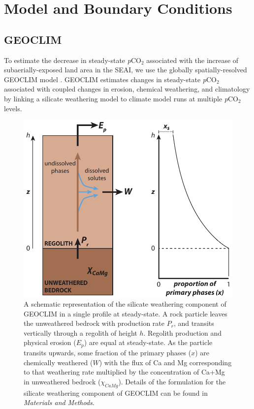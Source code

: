 \documentclass[9pt,twocolumn,twoside,lineno]{pnas-new}
\newcommand{\pCOtwo}{\textit{p}CO$_{2}$\xspace}
\newcommand{\MM}{\textit{Materials and Methods}\xspace}
\begin{document}
\section*{Model and Boundary Conditions}

\subsection*{GEOCLIM}

To estimate the decrease in steady-state \pCOtwo associated with the increase of subaerially-exposed land area in the SEAI, we use the globally spatially-resolved GEOCLIM model \cite{Godderis2017c}. GEOCLIM estimates changes in steady-state \pCOtwo associated with coupled changes in erosion, chemical weathering, and climatology by linking a silicate weathering model to climate model runs at multiple \pCOtwo levels.

\begin{figure}[h]
    \centering
    \includegraphics[width=1\linewidth]{Figures/regolith_schematic.pdf}
    \caption{A schematic representation of the silicate weathering component of GEOCLIM in a single profile at steady-state. A rock particle leaves the unweathered bedrock with production rate $P_{r}$, and transits vertically through a regolith of height $h$. Regolith production and physical erosion ($E_{p}$) are equal at steady-state. As the particle transits upwards, some fraction of the primary phases ($x$) are chemically weathered ($W$) with the flux of Ca and Mg corresponding to that weathering rate multiplied by the concentration of Ca+Mg in unweathered bedrock ($\chi_{CaMg}$). Details of the formulation for the silicate weathering component of GEOCLIM can be found in \MM.}
    \label{fig:regolith_schematic}
\end{figure}
\end{document}
